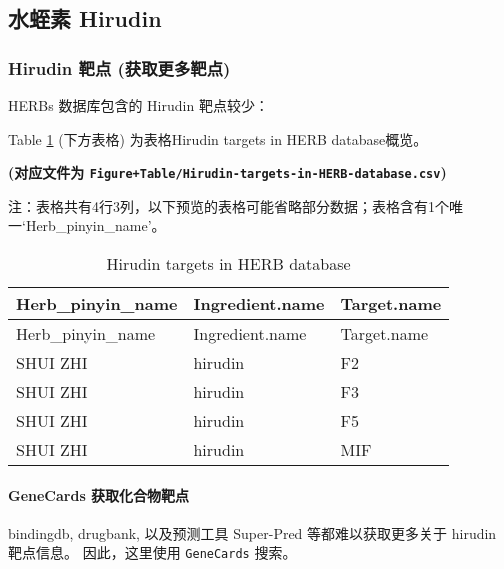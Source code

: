 \documentclass[
]{article}
\begin{document}
\hypertarget{ux6c34ux86edux7d20-hirudin}{%
\subsection{水蛭素 Hirudin}\label{ux6c34ux86edux7d20-hirudin}}

\hypertarget{hirudin-ux9776ux70b9-ux83b7ux53d6ux66f4ux591aux9776ux70b9}{%
\subsubsection{Hirudin 靶点 (获取更多靶点)}\label{hirudin-ux9776ux70b9-ux83b7ux53d6ux66f4ux591aux9776ux70b9}}

HERBs 数据库包含的 Hirudin 靶点较少：

Table \ref{tab:Hirudin-targets-in-HERB-database} (下方表格) 为表格Hirudin targets in HERB database概览。

\textbf{(对应文件为 \texttt{Figure+Table/Hirudin-targets-in-HERB-database.csv})}

\begin{center}\begin{tcolorbox}[colback=gray!10, colframe=gray!50, width=0.9\linewidth, arc=1mm, boxrule=0.5pt]注：表格共有4行3列，以下预览的表格可能省略部分数据；表格含有1个唯一`Herb\_pinyin\_name'。
\end{tcolorbox}
\end{center}

\begin{longtable}[]{@{}lll@{}}
\caption{\label{tab:Hirudin-targets-in-HERB-database}Hirudin targets in HERB database}\tabularnewline
\toprule
Herb\_pinyin\_name & Ingredient.name & Target.name\tabularnewline
\midrule
\endfirsthead
\toprule
Herb\_pinyin\_name & Ingredient.name & Target.name\tabularnewline
\midrule
\endhead
SHUI ZHI & hirudin & F2\tabularnewline
SHUI ZHI & hirudin & F3\tabularnewline
SHUI ZHI & hirudin & F5\tabularnewline
SHUI ZHI & hirudin & MIF\tabularnewline
\bottomrule
\end{longtable}

\hypertarget{genecards-ux83b7ux53d6ux5316ux5408ux7269ux9776ux70b9}{%
\paragraph{GeneCards 获取化合物靶点}\label{genecards-ux83b7ux53d6ux5316ux5408ux7269ux9776ux70b9}}

bindingdb, drugbank, 以及预测工具 Super-Pred 等都难以获取更多关于 hirudin 靶点信息。
因此，这里使用 \texttt{GeneCards} 搜索。
\end{document}
